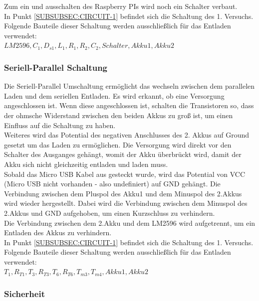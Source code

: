 \documentclass[12pt,a4paper]{article}
\begin{document}
{Zum ein und ausschalten des Raspberry PIs wird noch ein Schalter verbaut. \\
In Punkt \ref{SUBSUBSEC:CIRCUIT-1} befindet sich die Schaltung des 1. Versuchs. Folgende Bauteile dieser Schaltung werden ausschließlich für das Entladen verwendet:\\ $LM2596,C_1,D_{s1},L_1,R_1,R_2,C_2,Schalter,Akku1, Akku2$ \\

\subsubsection{Seriell-Parallel Schaltung}
\label{SUBSUBSEC:SERPAR}

Die Seriell-Parallel Umschaltung ermöglicht das wechseln zwischen dem parallelen Laden und dem seriellen Entladen. Es wird erkannt, ob eine Versorgung angeschlossen ist. Wenn diese angeschlossen ist, schalten die Transistoren so, dass der ohmsche Widerstand zwischen den beiden Akkus zu groß ist, um einen Einfluss auf die Schaltung zu haben.\\
Weiteres wird das Potential des negativen Anschlusses des 2. Akkus auf Ground gesetzt um das Laden zu ermöglichen. Die Versorgung wird direkt vor den Schalter des Ausganges gehängt, womit der Akku überbrückt wird, damit der Akku sich nicht gleichzeitig entladen und laden muss. \\[2ex] 
Sobald das Micro USB Kabel aus gesteckt wurde, wird das Potential von VCC (Micro USB nicht vorhanden - also undefiniert) auf GND gehängt. Die Verbindung zwischen dem Pluspol des Akku1 und dem Minuspol des 2.Akkus wird wieder hergestellt. Dabei wird die Verbindung zwischen dem Minuspol des 2.Akkus und GND aufgehoben, um einen Kurzschluss zu verhindern.  \\
Die Verbindung zwischen dem 2.Akku und dem LM2596 wird aufgetrennt, um ein Entladen des Akkus zu verhindern. \\
In Punkt \ref{SUBSUBSEC:CIRCUIT-1} befindet sich die Schaltung des 1. Versuchs. Folgende Bauteile dieser Schaltung werden ausschließlich für das Entladen verwendet:\\ $T_1,R_{T1},T_3,R_{T3},T_6,R_{T6},T_{m3},T_{m4}, Akku1, Akku2$ \\

\subsubsection{Sicherheit}
\label{SUBSUBSEC:Security}

}
\end{document}
